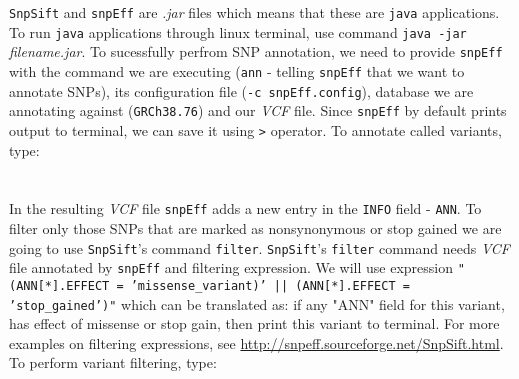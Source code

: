 \texttt{SnpSift} and \texttt{snpEff} are \textit{.jar} files which means that
these are \texttt{java} applications. To run \texttt{java} applications through linux terminal,
use command \texttt{java -jar} \textit{filename.jar}. To sucessfully perfrom SNP
annotation, we need to provide \texttt{snpEff} with the command we are executing 
(\texttt{ann} - telling \texttt{snpEff} that we want to annotate SNPs), its configuration file (\texttt{-c snpEff.config}),
database we are annotating against (\texttt{GRCh38.76}) and our \textit{VCF} file. Since \texttt{snpEff} by default prints
output to terminal, we can save it using \texttt{>} operator.
To annotate called variants, type:\\~\\
\\

In the resulting \textit{VCF} file \texttt{snpEff} adds a new entry in the \texttt{INFO} field - \texttt{ANN}.
To filter only those SNPs that are marked as nonsynonymous or stop gained we are going to
use \texttt{SnpSift}'s command \texttt{filter}. \texttt{SnpSift}'s \texttt{filter} command needs
\textit{VCF} file annotated by \texttt{snpEff} and filtering expression.
We will use expression \texttt{"(ANN[*].EFFECT = 'missense\_variant)' || (ANN[*].EFFECT = 'stop\_gained')"}
which can be translated as: if any "ANN" field for this variant, has effect of missense or stop gain, then print this variant
to terminal. For more examples on filtering expressions, see \url{http://snpeff.sourceforge.net/SnpSift.html}.
To perform variant filtering, type:\\~\\
\\
